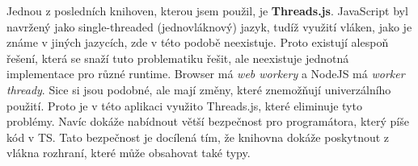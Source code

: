 Jednou z posledních knihoven, kterou jsem použil, je \textbf{Threads.js}\cite{Wermke_2019}. 
JavaScript byl navržený jako single-threaded (jednovláknový) jazyk, tudíž využití vláken, jako je známe v jiných jazycích, zde v této podobě neexistuje.
Proto existují alespoň řešení, která se snaží tuto problematiku řešit, ale neexistuje jednotná implementace pro různé runtime.
Browser má \textit{web workery} a NodeJS má \textit{worker thready}.
Sice si jsou podobné, ale mají změny, které znemožňují univerzálního použití.
Proto je v této aplikaci využito Threads.js, které eliminuje tyto problémy.
Navíc dokáže nabídnout větší bezpečnost pro programátora, který píše kód v TS. 
Tato bezpečnost je docílená tím, že knihovna dokáže poskytnout z vlákna rozhraní, které může obsahovat také typy.

\endinput
